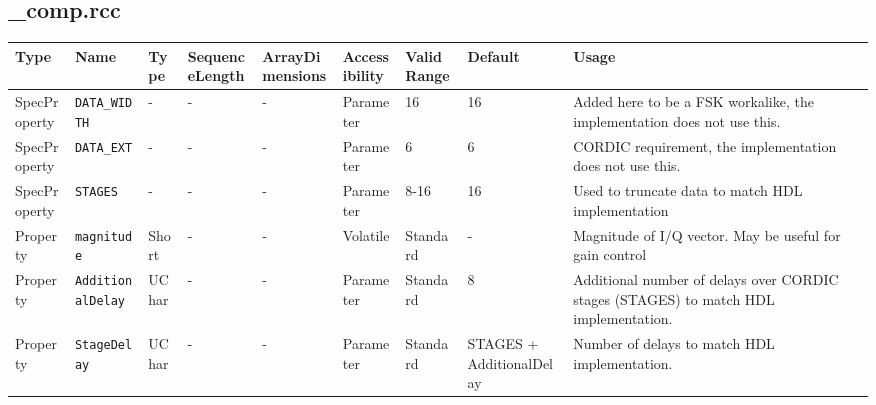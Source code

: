 \begin{landscape}
	\subsection*{\rcc_comp.rcc}
	\begin{scriptsize}
		\begin{longtable}{|p{}
                  |p{}
                  |p{}
                  |p{}
                  |p{}
                  |p{}
                  |p{}
                  |p{}
                  |p{}|}
			\hline
			\rowcolor{blue}
			Type         & Name              & Type  & SequenceLength & ArrayDimensions & Accessibility & Valid Range & Default & Usage                                                    \\
			\hline
			SpecProperty & \verb+DATA_WIDTH+ & -     & -              & -               & Parameter     & 16        & 16      & Added here to be a FSK workalike, the implementation does not use this. \\
			\hline
			SpecProperty & \verb+DATA_EXT+   & -     & -              & -               & Parameter     & 6           & 6       & CORDIC requirement, the implementation does not use this. \\
			\hline
			SpecProperty & \verb+STAGES+     & -     & -              & -               & Parameter     & 8-16        & 16      & Used to truncate data to match HDL implementation \\
			\hline
			Property     & \verb+magnitude+  & Short & -              & -               & Volatile      & Standard    & -       & Magnitude of I/Q vector. May be useful for gain control \\
			\hline			
			Property & \verb+AdditionalDelay+     & UChar     & -              & -               & Parameter     & Standard        & 8      & Additional number of delays over CORDIC stages (STAGES) to match HDL implementation.          \\
			\hline
			Property     & \verb+StageDelay+  & UChar & -              & -               & Parameter      & Standard    & STAGES + AdditionalDelay       & Number of delays to match HDL implementation. \\
			\hline


\end{longtable}
\end{scriptsize}
\end{landscape}

